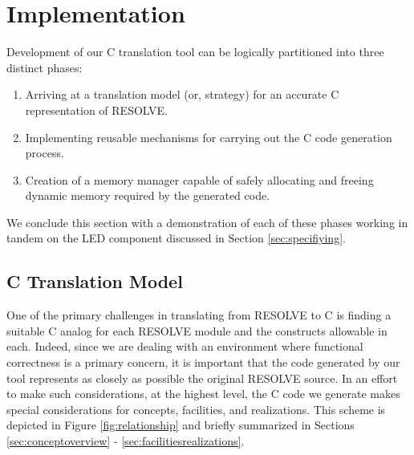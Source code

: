 \section{Implementation}\label{sec:impl}
Development of our C translation tool can be logically partitioned into three distinct phases: 
\begin{enumerate}
\item Arriving at a translation model (or, strategy) for an accurate C representation of RESOLVE.
\item Implementing reusable mechanisms for carrying out the C code generation process.
\item Creation of a memory manager capable of safely allocating and freeing dynamic memory required by the generated code.
\end{enumerate}
We conclude this section with a demonstration of each of these phases working in tandem on the LED component discussed in Section \ref{sec:specifiying}. 

\subsection{C Translation Model}
One of the primary challenges in translating from RESOLVE to C is finding a suitable C analog for each RESOLVE module and the constructs allowable in each. Indeed, since we are dealing with an environment where functional correctness is a primary concern, it is important that the code generated by our tool represents as closely as possible the original RESOLVE source. In an effort to make such considerations, at the highest level, the C code we generate makes special considerations for concepts, facilities, and realizations. This scheme is depicted in Figure \ref{fig:relationship} and briefly summarized in Sections \ref{sec:conceptoverview} - \ref{sec:facilitiesrealizations}.

